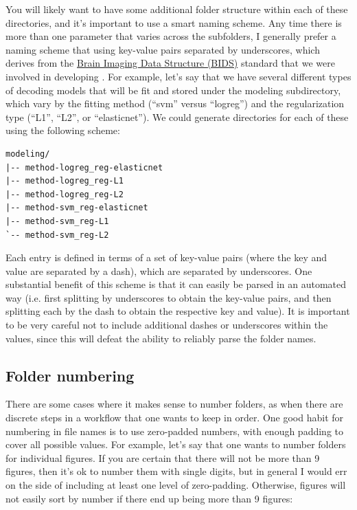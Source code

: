 You will likely want to have some additional folder structure within each of these directories, and it's important to use a smart naming scheme.  Any time there is more than one parameter that varies across the subfolders, I generally prefer a naming scheme that using key-value pairs separated by underscores, which derives from the \href{https://bids.neuroimaging.io/}{Brain Imaging Data Structure (BIDS)} standard that we were involved in developing \citep{Poldrack:2024aa}. For example, let's say that we have several different types of decoding models that will be fit and stored under the modeling subdirectory, which vary by the fitting method (``svm'' versus ``logreg'') and the regularization type (``L1'', ``L2'', or ``elasticnet'').  We could generate directories for each of these using the following scheme:

\begin{lstlisting}[style=shell]
modeling/
|-- method-logreg_reg-elasticnet
|-- method-logreg_reg-L1
|-- method-logreg_reg-L2
|-- method-svm_reg-elasticnet
|-- method-svm_reg-L1
`-- method-svm_reg-L2
\end{lstlisting}

Each entry is defined in terms of a set of key-value pairs (where the key and value are separated by a dash), which are separated by underscores. 
One substantial benefit of this scheme is that it can easily be parsed in an automated way (i.e. first splitting by underscores to obtain the key-value pairs, and then splitting each by the dash to obtain the respective key and value).  It is important to be very careful not to include additional dashes or underscores within the values, since this will defeat the ability to reliably parse the folder names.

\subsection{Folder numbering}

There are some cases where it makes sense to number folders, as when there are discrete steps in a workflow that one wants to keep in order.  One good habit for numbering in file names is to use zero-padded numbers, with enough padding to cover all possible values.  For example, let's say that one wants to number folders for individual figures.  If you are certain that there will not be more than 9 figures, then it's ok to number them with single digits, but in general I would err on the side of including at least one level of zero-padding. Otherwise, figures will not easily sort by number if there end up being more than 9 figures:

